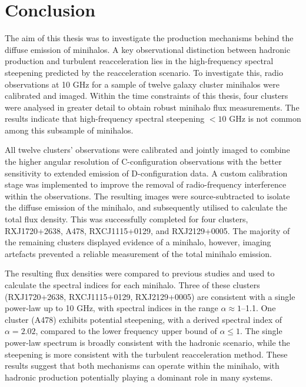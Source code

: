 \chapter[Conclusion]{Conclusion}
\label{Chap:Conclusion}

The aim of this thesis was to investigate the production mechanisms behind the diffuse emission of minihalos. A key observational distinction between hadronic production and turbulent reacceleration lies in the high-frequency spectral steepening predicted by the reacceleration scenario. To investigate this, radio observations at 10 GHz for a sample of twelve galaxy cluster minihalos were calibrated and imaged. Within the time constraints of this thesis, four clusters were analysed in greater detail to obtain robust minihalo flux measurements. The results indicate that high-frequency spectral steepening $<\!10$ GHz is not common among this subsample of minihalos.

All twelve clusters' observations were calibrated and jointly imaged to combine the higher angular resolution of C-configuration observations with the better sensitivity to extended emission of D-configuration data. A custom calibration stage was implemented to improve the removal of radio-frequency interference within the observations. The resulting images were source-subtracted to isolate the diffuse emission of the minihalo, and subsequently utilised to calculate the total flux density. This was successfully completed for four clusters, RXJ1720+2638, A478, RXCJ1115+0129, and RXJ2129+0005. The majority of the remaining clusters displayed evidence of a minihalo, however, imaging artefacts prevented a reliable measurement of the total minihalo emission.

The resulting flux densities were compared to previous studies and used to calculate the spectral indices for each minihalo. Three of these clusters (RXJ1720+2638, RXCJ1115+0129, RXJ2129+0005) are consistent with a single power-law up to 10 GHz, with spectral indices in the range $\alpha\approx1$--1.1. One cluster (A478) exhibits potential steepening, with a derived spectral index of $\alpha=2.02$, compared to the lower frequency upper bound of $\alpha\leq1$. The single power-law spectrum is broadly consistent with the hadronic scenario, while the steepening is more consistent with the turbulent reacceleration method. These results suggest that both mechanisms can operate within the minihalo, with hadronic production potentially playing a dominant role in many systems. 

